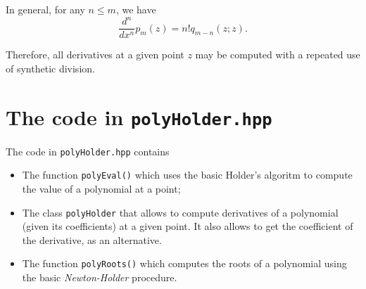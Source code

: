 \documentclass[10pt,a4paper]{article}
\theoremstyle{definition}%
\begin{document}
In general, for any $n\le m$, we have
\begin{equation}
\boxed{\frac{d^n}{dx^n}p_m(z)=n! q_{m-n}(z;z).}
\end{equation}

Therefore, all derivatives at a given point $z$ may be computed with a repeated use of synthetic division.

\section{The code in \texttt{polyHolder.hpp}}
The code in \texttt{polyHolder.hpp} contains
\begin{itemize}
    \item The function \lstinline|polyEval()| which uses the basic Holder's algoritm to compute the value of a polynomial at a point;
    \item The class \lstinline|polyHolder| that allows to compute derivatives of a polynomial (given its coefficients) at a given point. It also allows to get the coefficient of the
    derivative, as an alternative.
    \item The function \lstinline|polyRoots()| which computes the roots of a polynomial using the basic \emph{Newton-Holder} procedure.
\end{itemize}
\end{document}
